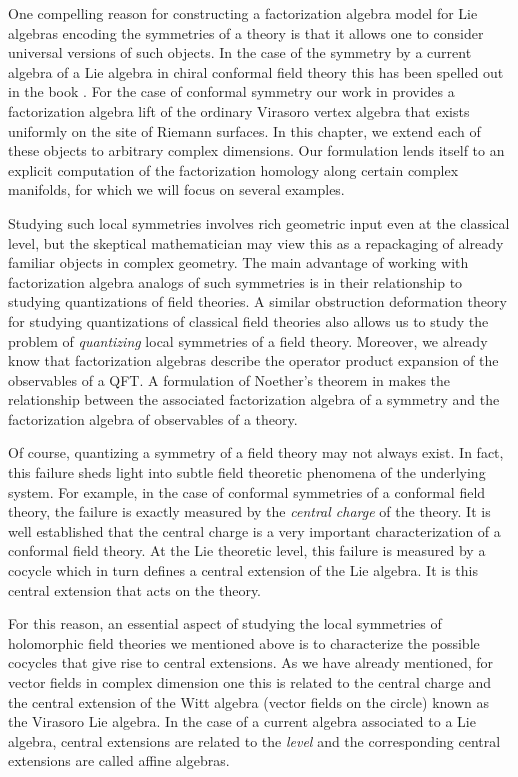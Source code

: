 \documentclass[10pt]{amsart}
\begin{document}
One compelling reason for constructing a factorization algebra model for Lie algebras encoding the symmetries of a theory is that it allows one to consider universal versions of such objects.
In the case of the symmetry by a current algebra of a Lie algebra in chiral conformal field theory this has been spelled out in the book \cite{CG}. 
For the case of conformal symmetry our work in \cite{BWVir} provides a factorization algebra lift of the ordinary Virasoro vertex algebra that exists uniformly on the site of Riemann surfaces. 
In this chapter, we extend each of these objects to arbitrary complex dimensions.
Our formulation lends itself to an explicit computation of the factorization homology along certain complex manifolds, for which we will focus on several examples.

Studying such local symmetries involves rich geometric input even at the classical level, but the skeptical mathematician may view this as a repackaging of already familiar objects in complex geometry.
The main advantage of working with factorization algebra analogs of such symmetries is in their relationship to studying quantizations of field theories.
A similar obstruction deformation theory for studying quantizations of classical field theories also allows us to study the problem of {\em quantizing} local symmetries of a field theory.
Moreover, we already know that factorization algebras describe the operator product expansion of the observables of a QFT.
A formulation of Noether's theorem in \cite{CG} makes the relationship between the associated factorization algebra of a symmetry and the factorization algebra of observables of a theory.

Of course, quantizing a symmetry of a field theory may not always exist.
In fact, this failure sheds light into subtle field theoretic phenomena of the underlying system. 
For example, in the case of conformal symmetries of a conformal field theory, the failure is exactly measured by the {\em central charge} of the theory. 
It is well established that the central charge is a very important characterization of a conformal field theory.
At the Lie theoretic level, this failure is measured by a cocycle which in turn defines a central extension of the Lie algebra. 
It is this central extension that acts on the theory. 

For this reason, an essential aspect of studying the local symmetries of holomorphic field theories we mentioned above is to characterize the possible cocycles that give rise to central extensions. 
As we have already mentioned, for vector fields in complex dimension one this is related to the central charge and the central extension of the Witt algebra (vector fields on the circle) known as the Virasoro Lie algebra.
In the case of a current algebra associated to a Lie algebra, central extensions are related to the {\em level} and the corresponding central extensions are called affine algebras. 
\end{document}
